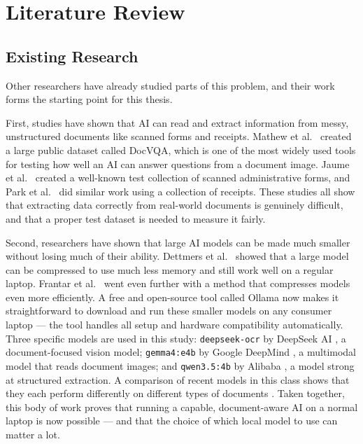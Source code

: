 \section{Literature Review}
\label{sec:literature}

\subsection{Existing Research}

Other researchers have already studied parts of this problem, and their work forms the starting point for this thesis.

First, studies have shown that AI can read and extract information from messy, unstructured documents like scanned forms and receipts. Mathew et al.\ \cite{mathew_docvqa_2021} created a large public dataset called DocVQA, which is one of the most widely used tools for testing how well an AI can answer questions from a document image. Jaume et al.\ \cite{jaume2019funsd} created a well-known test collection of scanned administrative forms, and Park et al.\ \cite{park2019cord} did similar work using a collection of receipts. These studies all show that extracting data correctly from real-world documents is genuinely difficult, and that a proper test dataset is needed to measure it fairly.

Second, researchers have shown that large AI models can be made much smaller without losing much of their ability. Dettmers et al.\ \cite{dettmers2022llmint8} showed that a large model can be compressed to use much less memory and still work well on a regular laptop. Frantar et al.\ \cite{frantar2022gptq} went even further with a method that compresses models even more efficiently. A free and open-source tool called Ollama \cite{ollama_2024} now makes it straightforward to download and run these smaller models on any consumer laptop --- the tool handles all setup and hardware compatibility automatically. Three specific models are used in this study: \texttt{deepseek-ocr} by DeepSeek AI \cite{deepseek_ocr_2024}, a document-focused vision model; \texttt{gemma4:e4b} by Google DeepMind \cite{gemma4_2026}, a multimodal model that reads document images; and \texttt{qwen3.5:4b} by Alibaba \cite{qwen3_2025}, a model strong at structured extraction. A comparison of recent models in this class shows that they each perform differently on different types of documents \cite{gemma4_phi4_qwen3_2026}. Taken together, this body of work proves that running a capable, document-aware AI on a normal laptop is now possible --- and that the choice of which local model to use can matter a lot.

